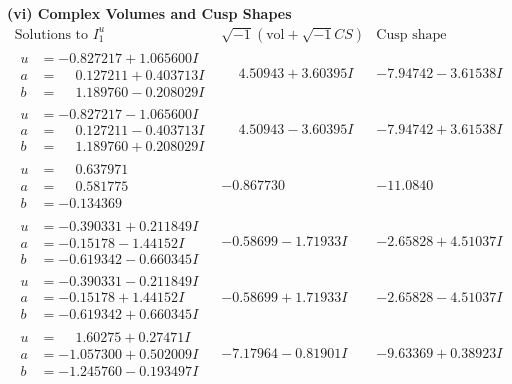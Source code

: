 \documentclass[1p]{elsarticle_modified}
\theoremstyle{definition}
\newcommand{\I}{\sqrt{-1}}
\begin{document}
\newpage\flushleft \textbf{(vi) Complex Volumes and Cusp Shapes}
$$\begin{array}{c|c|c}  
\text{Solutions to }I^u_{1}& \I (\text{vol} + \sqrt{-1}CS) & \text{Cusp shape}\\
 \hline 
\begin{aligned}
u &= -0.827217 + 1.065600 I \\
a &= \phantom{-}0.127211 + 0.403713 I \\
b &= \phantom{-}1.189760 - 0.208029 I\end{aligned}
 & \phantom{-}4.50943 + 3.60395 I & -7.94742 - 3.61538 I \\ \hline\begin{aligned}
u &= -0.827217 - 1.065600 I \\
a &= \phantom{-}0.127211 - 0.403713 I \\
b &= \phantom{-}1.189760 + 0.208029 I\end{aligned}
 & \phantom{-}4.50943 - 3.60395 I & -7.94742 + 3.61538 I \\ \hline\begin{aligned}
u &= \phantom{-}0.637971\phantom{ +0.000000I} \\
a &= \phantom{-}0.581775\phantom{ +0.000000I} \\
b &= -0.134369\phantom{ +0.000000I}\end{aligned}
 & -0.867730\phantom{ +0.000000I} & -11.0840\phantom{ +0.000000I} \\ \hline\begin{aligned}
u &= -0.390331 + 0.211849 I \\
a &= -0.15178 - 1.44152 I \\
b &= -0.619342 - 0.660345 I\end{aligned}
 & -0.58699 - 1.71933 I & -2.65828 + 4.51037 I \\ \hline\begin{aligned}
u &= -0.390331 - 0.211849 I \\
a &= -0.15178 + 1.44152 I \\
b &= -0.619342 + 0.660345 I\end{aligned}
 & -0.58699 + 1.71933 I & -2.65828 - 4.51037 I \\ \hline\begin{aligned}
u &= \phantom{-}1.60275 + 0.27471 I \\
a &= -1.057300 + 0.502009 I \\
b &= -1.245760 - 0.193497 I\end{aligned}
 & -7.17964 - 0.81901 I & -9.63369 + 0.38923 I \\ \hline\begin{aligned}

\end{aligned}
\end{array}$$
\end{document}
